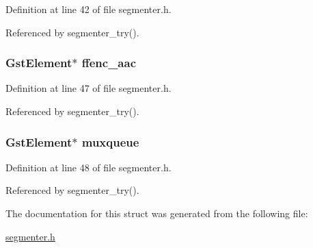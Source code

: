 \-Definition at line 42 of file segmenter.\-h.



\-Referenced by segmenter\-\_\-try().

\hypertarget{struct_audio_bag_a424c95ed83262d5926c84a1ac8698a8a}{
\subsubsection[{ffenc\-\_\-aac}]{\setlength{\rightskip}{0pt plus 5cm}\-Gst\-Element$\ast$ {\bf ffenc\-\_\-aac}}}\label{struct_audio_bag_a424c95ed83262d5926c84a1ac8698a8a}


\-Definition at line 47 of file segmenter.\-h.



\-Referenced by segmenter\-\_\-try().

\hypertarget{struct_audio_bag_a917a2aa09433aafbcda72454d53c196f}{
\subsubsection[{muxqueue}]{\setlength{\rightskip}{0pt plus 5cm}\-Gst\-Element$\ast$ {\bf muxqueue}}}\label{struct_audio_bag_a917a2aa09433aafbcda72454d53c196f}


\-Definition at line 48 of file segmenter.\-h.



\-Referenced by segmenter\-\_\-try().



\-The documentation for this struct was generated from the following file\-:\begin{DoxyCompactItemize}
\item 
\hyperlink{segmenter_8h}{segmenter.\-h}\end{DoxyCompactItemize}
